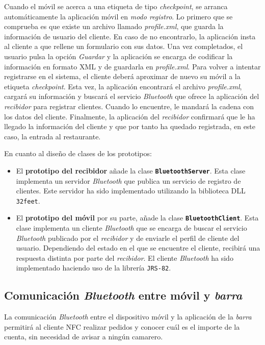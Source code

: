 Cuando el móvil se acerca a una etiqueta de tipo \emph{checkpoint}, se
arranca automáticamente la aplicación móvil en \emph{modo registro}. Lo
primero que se comprueba es que existe un archivo llamado \emph{profile.xml},
que guarda la información de usuario del cliente. En caso de no encontrarlo,
la aplicación insta al cliente a que rellene un formulario con sus datos.
Una vez completados, el usuario pulsa la opción \emph{Guardar} y la
aplicación se encarga de codificar la información en formato \acs{XML} y de
guardarla en \emph{profile.xml}. Para volver a intentar registrarse en el
sistema, el cliente deberá aproximar de nuevo su móvil a la etiqueta
\emph{checkpoint}. Esta vez, la aplicación encontrará el archivo
\emph{profile.xml}, cargará su información y buscará el servicio
\emph{Bluetooth} que ofrece la aplicación del \emph{recibidor} para
registrar clientes. Cuando lo encuentre, le mandará la cadena con los datos
del cliente. Finalmente, la aplicación del \emph{recibidor} confirmará que
le ha llegado la información del cliente y que por tanto ha quedado
registrada, en este caso, la entrada al restaurante.

En cuanto al diseño de clases de los prototipos:
\begin{itemize}
\item El \textbf{prototipo del recibidor} añade la clase
\textbf{\texttt{BluetoothServer}}. Esta clase implementa un servidor
\emph{Bluetooth} que publica un servicio de registro de clientes. Este
servidor ha sido implementado utilizando la biblioteca \acs{DLL}
\texttt{32feet}.
\item El \textbf{prototipo del móvil} por su parte, añade la clase
\textbf{\texttt{BluetoothClient}}. Esta clase implementa un cliente
\emph{Bluetooth} que se encarga de buscar el servicio \emph{Bluetooth}
publicado por el \emph{recibidor} y de enviarle el perfil de cliente del
usuario. Dependiendo del estado en el que se encuentre el cliente, recibirá
una respuesta distinta por parte del \emph{recibidor}. El cliente
\emph{Bluetooth} ha sido implementado haciendo uso de la librería
\texttt{\acs{JRS}-82}.
\end{itemize}

\subsection{Comunicación \emph{Bluetooth} entre móvil y \emph{barra}}
\label{subsec:mobile-bar}
La comunicación \emph{Bluetooth} entre el dispositivo móvil y la aplicación
de la \emph{barra} permitirá al cliente \acs{NFC} realizar pedidos y conocer
cuál es el importe de la cuenta, sin necesidad de avisar a ningún camarero.

